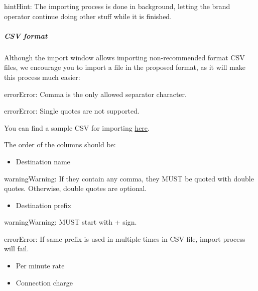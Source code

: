 \documentclass[letterpaper,10pt,english]{sphinxmanual}
\begin{document}
\begin{notice}{hint}{Hint:}
The importing process is done in background, letting the brand operator
continue doing other stuff while it is finished.
\end{notice}


\subparagraph{CSV format}
\label{administration_portal/brand/billing/destination_rates:csv-format}
Although the import window allows importing non-recommended format CSV files,
we encourage you to import a file in the proposed format, as it will make
this process much easier:

\begin{notice}{error}{Error:}
Comma is the only allowed separator character.
\end{notice}

\begin{notice}{error}{Error:}
Single quotes are not supported.
\end{notice}

You can find a sample CSV for importing \href{https://raw.githubusercontent.com/irontec/ivozprovider/artemis/web/admin/samples/pricesSample.csv}{here}.

The order of the columns should be:
\begin{itemize}
\item {} 
Destination name

\end{itemize}

\begin{notice}{warning}{Warning:}
If they contain any comma, they MUST be quoted with double quotes. Otherwise, double quotes are optional.
\end{notice}
\begin{itemize}
\item {} 
Destination prefix

\end{itemize}

\begin{notice}{warning}{Warning:}
MUST start with + sign.
\end{notice}

\begin{notice}{error}{Error:}
If same prefix is used in multiple times in CSV file, import process will fail.
\end{notice}
\begin{itemize}
\item {} 
Per minute rate

\item {} 
Connection charge

\end{itemize}
\end{document}
